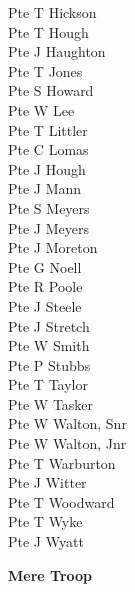 \begin{multicols}{2}
  Pte T Hickson \\
  Pte T Hough \\
  Pte J Haughton \\
  Pte T Jones \\
  Pte S Howard \\
  Pte W Lee \\
  Pte T Littler \\
  Pte C Lomas \\
  Pte J Hough \\
  Pte J Mann \\
  Pte S Meyers \\
  Pte J Meyers \\
  Pte J Moreton \\
  Pte G Noell \\
  Pte R Poole \\
  Pte J Steele \\
  Pte J Stretch \\
  Pte W Smith \\
  Pte P Stubbs \\
  Pte T Taylor \\
  Pte W Tasker \\
  Pte W Walton, Snr \\
  Pte W Walton, Jnr \\
  Pte T Warburton \\
  Pte J Witter \\
  Pte T Woodward \\
  Pte T Wyke \\
  Pte J Wyatt \\
\end{multicols}

\begin{center}
  \Large
  \textbf{Mere Troop}
\end{center}

